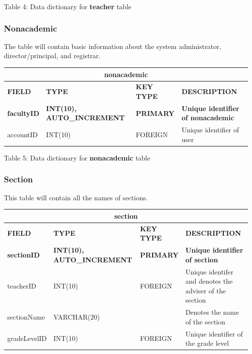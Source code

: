 \documentclass[11pt,a4paper,titlepage]{article}
\begin{document}
\vspace{.5cm}
\begin{center}
    Table 4: Data dictionary for \textbf{teacher} table
\end{center}

\newpage

\subsubsection{Nonacademic}

The table will contain basic information about the system administrator, director/principal, and registrar.

\vspace{1cm}
\begin{longtable}{ |p{2.5cm}|p{4.5cm}|p{2.5cm}|p{3cm}|  }
    \hline
    \multicolumn{4}{|c|}{\textbf{nonacademic}} \\
    \hline
    \textbf{FIELD}&\textbf{TYPE}&\textbf{KEY TYPE}&\textbf{DESCRIPTION}\\
    \hline
    \textbf{facultyID}   & \textbf{INT(10), AUTO\_INCREMENT}  & \textbf{PRIMARY} & \textbf{Unique identifier of nonacademic}\\ \hline
    accountID& INT(10) & FOREIGN & Unique identifier of user \\ \hline
\end{longtable}

\vspace{.5cm}
\begin{center}
    Table 5: Data dictionary for \textbf{nonacademic} table
\end{center}

\newpage

\subsubsection{Section}

This table will contain all the names of sections.

\vspace{1cm}
\begin{longtable}{ |p{2.5cm}|p{4.5cm}|p{2.5cm}|p{3cm}|  }
    \hline
    \multicolumn{4}{|c|}{\textbf{section}} \\
    \hline
    \textbf{FIELD}&\textbf{TYPE}&\textbf{KEY TYPE}&\textbf{DESCRIPTION}\\
    \hline
    \textbf{sectionID}   & \textbf{INT(10), AUTO\_INCREMENT} & \textbf{PRIMARY} & \textbf{Unique identifier of section}\\ \hline
    teacherID & INT(10) & FOREIGN & Unique identifer and denotes the adviser of the section \\ \hline
    sectionName & VARCHAR(20) & & Denotes the name of the section \\ \hline
    gradeLevelID & INT(10) & FOREIGN & Unique identifier of the grade level \\ \hline
\end{longtable}
\end{document}
